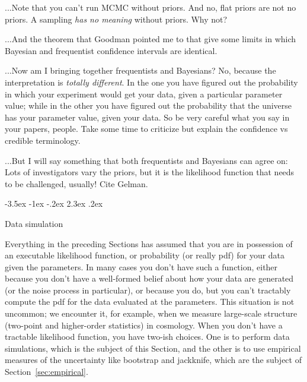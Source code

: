 \documentclass[10pt]{article}
\makeatletter
\newcommand{\sectionname}{Section}
\renewcommand\section{\@startsection {section}{1}{\z@}%
  {-3.5ex \@plus -1ex \@minus -.2ex}%
  {2.3ex \@plus.2ex}%
  {\raggedright\normalfont\Large\bfseries}}
\makeatother
\begin{document}
...Note that you can't run MCMC without priors. And no, flat priors are not no
priors. A sampling \emph{has no meaning} without priors. Why not?

...And the theorem that Goodman pointed me to that give some limits in which
Bayesian and frequentist confidence intervals are identical.

...Now am I bringing together frequentists and Bayesians? No, because the
interpretation is \emph{totally different}. In the one you have figured out the
probability in which your experiment would get your data, given a particular
parameter value; while in the other you have figured out the probability that
the universe has your parameter value, given your data. So be very careful
what you say in your papers, people. Take some time to criticize but explain the
confidence vs credible terminology.

...But I will say something that both frequentists and Bayesians can agree on:
Lots of investigators vary the priors, but it is the likelihood function
that needs to be challenged, usually! Cite Gelman.

\section{Data simulation}\label{sec:simulation}

Everything in the preceding \sectionname s has assumed that you are in possession
of an executable likelihood function, or probability (or really pdf)
for your data given the parameters.
In many cases you don't have such a function, either because you don't have
a well-formed belief about how your data are generated (or the noise process
in particular), or because you do, but you can't tractably compute the
pdf for the data evaluated at the parameters.
This situation is not uncommon; we encounter it, for example,
when we measure large-scale structure (two-point and higher-order statistics)
in cosmology.
When you don't have a tractable likelihood function, you have two-ish choices.
One is to perform data simulations, which is the subject of this \sectionname,
and the other is to use empirical measures of the uncertainty like bootstrap and
jackknife, which are the subject of \sectionname~\ref{sec:empirical}.
\end{document}
